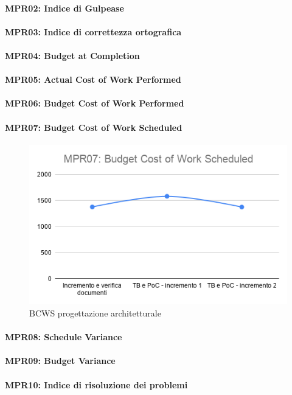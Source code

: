 \paragraph*{MPR02: Indice di Gulpease}
\paragraph*{MPR03: Indice di correttezza ortografica}
\paragraph*{MPR04: Budget at Completion}
\paragraph*{MPR05: Actual Cost of Work Performed} \paragraph*{MPR06: Budget Cost of Work Performed} \paragraph*{MPR07: Budget Cost of Work Scheduled}
 \begin{figure}[ht]
	\centering
	\includegraphics[scale=0.6]{Immagini/BCWS_PArchitetturale.png}
	\caption{BCWS progettazione architetturale}
	\label{fig:BCWS_PArchitetturale}
\end{figure}
 \paragraph*{MPR08: Schedule Variance}
\paragraph*{MPR09: Budget Variance}
\paragraph*{MPR10: Indice di risoluzione dei problemi}